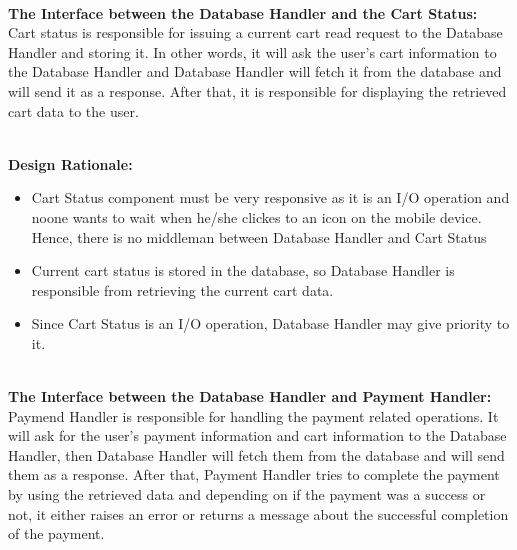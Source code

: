 \documentclass[11pt]{article}
\begin{document}
    \textbf{\\The Interface between the Database Handler and the Cart Status:\\}
    Cart status is responsible for issuing a current cart read request to the Database Handler and storing it. In other words, it will ask the user's cart information to the Database Handler and 
    Database Handler will fetch it from the database and will send it as a response. After that, it is responsible for displaying the retrieved cart data to the user. 
    
    \textbf{\\Design Rationale:}
    \begin{itemize}
       \item Cart Status component must be very responsive as it is an I/O operation and noone wants to wait when he/she clickes to an icon on the mobile device. 
       Hence, there is no middleman between Database Handler and Cart Status
       \item Current cart status is stored in the database, so Database Handler is responsible from retrieving the current cart data. 
       \item Since Cart Status is an I/O operation, Database Handler may give priority to it.
    \end{itemize}
    
    \textbf{\\The Interface between the Database Handler and Payment Handler:\\}
    Paymend Handler is responsible for handling the payment related operations. It will ask for the user's payment information and cart information to the Database Handler,
    then Database Handler will fetch them from the database and will send them as a response. 
    After that, Payment Handler tries to complete the payment by using the retrieved data and depending on if the payment was a success or not, it either raises an error or 
    returns a message about the successful completion of the payment.
\end{document}
